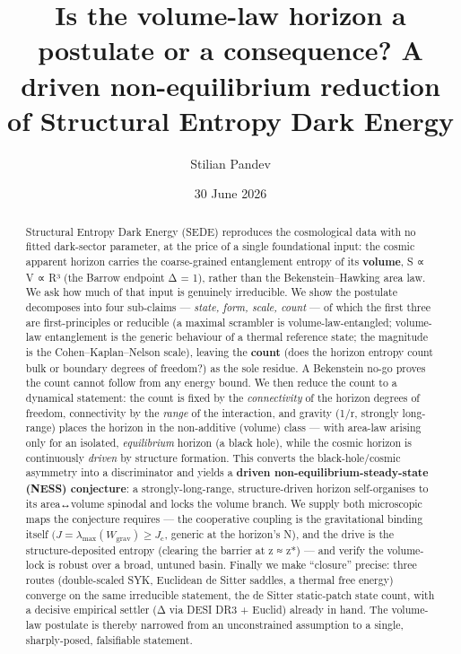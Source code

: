 \documentclass[
  10pt,
]{article}
\title{Is the volume-law horizon a postulate or a consequence? A driven
non-equilibrium reduction of Structural Entropy Dark Energy}
\author{Stilian Pandev}
\date{30 June 2026}
\begin{document}
\maketitle
\begin{abstract}
Structural Entropy Dark Energy (SEDE) reproduces the cosmological data
with no fitted dark-sector parameter, at the price of a single
foundational input: the cosmic apparent horizon carries the
coarse-grained entanglement entropy of its \textbf{volume}, S ∝ V ∝ R³
(the Barrow endpoint Δ = 1), rather than the Bekenstein--Hawking area
law. We ask how much of that input is genuinely irreducible. We show the
postulate decomposes into four sub-claims --- \emph{state, form, scale,
count} --- of which the first three are first-principles or reducible (a
maximal scrambler is volume-law-entangled; volume-law entanglement is
the generic behaviour of a thermal reference state; the magnitude is the
Cohen--Kaplan--Nelson scale), leaving the \textbf{count} (does the
horizon entropy count bulk or boundary degrees of freedom?) as the sole
residue. A Bekenstein no-go proves the count cannot follow from any
energy bound. We then reduce the count to a dynamical statement: the
count is fixed by the \emph{connectivity} of the horizon degrees of
freedom, connectivity by the \emph{range} of the interaction, and
gravity (1/r, strongly long-range) places the horizon in the
non-additive (volume) class --- with area-law arising only for an
isolated, \emph{equilibrium} horizon (a black hole), while the cosmic
horizon is continuously \emph{driven} by structure formation. This
converts the black-hole/cosmic asymmetry into a discriminator and yields
a \textbf{driven non-equilibrium-steady-state (NESS) conjecture}: a
strongly-long-range, structure-driven horizon self-organises to its
area↔volume spinodal and locks the volume branch. We supply both
microscopic maps the conjecture requires --- the cooperative coupling is
the gravitational binding itself
\((J = \lambda _{\mathrm{max}}(W_{\mathrm{grav}}) \geq  J_{\mathrm{c}}\),
generic at the horizon's N), and the drive is the structure-deposited
entropy (clearing the barrier at z ≈ z*) --- and verify the volume-lock
is robust over a broad, untuned basin. Finally we make ``closure''
precise: three routes (double-scaled SYK, Euclidean de Sitter saddles, a
thermal free energy) converge on the same irreducible statement, the de
Sitter static-patch state count, with a decisive empirical settler (Δ
via DESI DR3 + Euclid) already in hand. The volume-law postulate is
thereby narrowed from an unconstrained assumption to a single,
sharply-posed, falsifiable statement.
\end{abstract}
\end{document}
